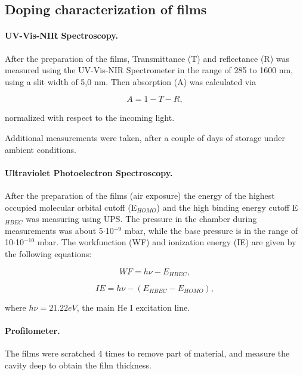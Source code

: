 \subsection{Doping characterization of films}

\paragraph{UV-Vis-NIR Spectroscopy.}After the preparation of the films, Transmittance (T) and reflectance (R) was measured using the UV-Vis-NIR Spectrometer in the range of 285 to 1600 nm, using a slit width of 5,0 nm. Then absorption (A) was calculated via


\begin{equation}\label{eq:abs}
	A = 1 - T - R,
\end{equation}

normalized with respect to the incoming light. 

Additional measurements were taken, after a couple of days of storage under ambient conditions.

\paragraph{Ultraviolet Photoelectron Spectroscopy.}After the preparation of the films (air exposure) the energy of the highest occupied molecular orbital cutoff (E$_{HOMO}$) and the high binding energy cutoff E$_{HBEC}$ was measuring using UPS. The pressure in the chamber during measurements was about 5$\cdot$10$^{-9}$ mbar, while the base pressure is in the range of 10$\cdot$10$^{-10}$ mbar. The workfunction (WF) and ionization energy (IE) are given by the following equations:

\begin{equation}\label{eq:wf}
	WF = h\nu - E_{HBEC},
\end{equation}

\begin{equation}\label{eq:ie}
	IE = h\nu - (E_{HBEC}-E_{HOMO}),
\end{equation}

where $h\nu = 21.22 eV$, the main He I excitation line. 

\paragraph{Profilometer.} The films were scratched 4 times to remove part of material, and measure the cavity deep to obtain the film thickness.

